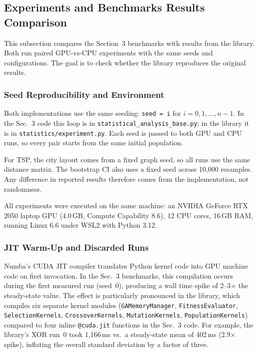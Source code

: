 
\newpage
\subsection{Experiments and Benchmarks Results Comparison}



This subsection compares the Section~3 benchmarks with results from the library. Both run paired GPU-vs-CPU experiments with the same seeds and configurations. The goal is to check whether the library reproduces the original results.

\subsubsection*{Seed Reproducibility and Environment} Both implementations use the same seeding: \texttt{seed = i} for $i = 0, 1, \dots, n{-}1$. In the Sec.~3 code this loop is in \texttt{statistical\_analysis\_base.py}; in the library it is in \texttt{statistics/experiment.py}. Each seed is passed to both GPU and CPU runs, so every pair starts from the same initial population.

For TSP, the city layout comes from a fixed graph seed, so all runs use the same distance matrix. The bootstrap CI also uses a fixed seed across 10{,}000 resamples. Any difference in reported results therefore comes from the implementation, not randomness.

All experiments were executed on the same machine: an NVIDIA GeForce RTX 2050 laptop GPU (4.0\,GB, Compute Capability 8.6), 12 CPU cores, 16\,GB RAM, running Linux 6.6 under WSL2 with Python 3.12.

\subsubsection*{JIT Warm-Up and Discarded Runs}

Numba's CUDA JIT compiler translates Python kernel code into GPU machine code on first invocation. In the Sec.~3 benchmarks, this compilation occurs during the first measured run (seed~0), producing a wall time spike of 2--3$\times$ the steady-state value. The effect is particularly pronounced in the library, which compiles six separate kernel modules (\texttt{GAMemory\-Manager}, \texttt{Fitness\-Evaluator}, \texttt{Selection\-Kernels}, \texttt{Crossover\-Kernels}, \texttt{Mutation\-Kernels}, \texttt{Population\-Kernels}) compared to four inline \texttt{@cuda.jit} functions in the Sec.~3 code. For example, the library's XOR run~0 took 1{,}166\,ms vs.\ a steady-state mean of 402\,ms (2.9$\times$ spike), inflating the overall standard deviation by a factor of three.

